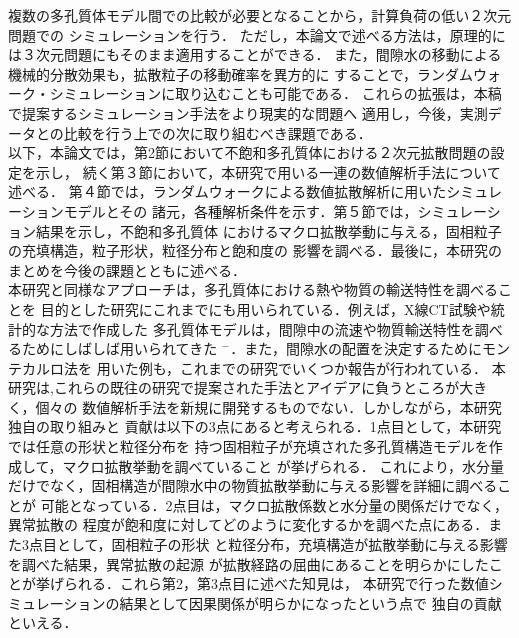 複数の多孔質体モデル間での比較が必要となることから，計算負荷の低い２次元問題での
シミュレーションを行う．
ただし，本論文で述べる方法は，原理的には３次元問題にもそのまま適用することができる．
また，間隙水の移動による機械的分散効果も，拡散粒子の移動確率を異方的に
することで，ランダムウォーク・シミュレーションに取り込むことも可能である．
これらの拡張は，本稿で提案するシミュレーション手法をより現実的な問題へ
適用し，今後，実測データとの比較を行う上での次に取り組むべき課題である．\\
\hspace{\parindent}
以下，本論文では，第2節において不飽和多孔質体における２次元拡散問題の設定を示し，
続く第３節において，本研究で用いる一連の数値解析手法について述べる．
第４節では，ランダムウォークによる数値拡散解析に用いたシミュレーションモデルとその
諸元，各種解析条件を示す．第５節では，シミュレーション結果を示し，不飽和多孔質体
におけるマクロ拡散挙動に与える，固相粒子の充填構造，粒子形状，粒径分布と飽和度の
影響を調べる．最後に，本研究のまとめを今後の課題とともに述べる．\\
\hspace{\parindent}
本研究と同様なアプローチは，多孔質体における熱や物質の輸送特性を調べることを
目的とした研究にこれまでにも用いられている．例えば，X線CT試験や統計的な方法で作成した
多孔質体モデルは，間隙中の流速や物質輸送特性を調べるためにしばしば用いられてきた
\cite{Liang}$^-$\cite{Narsilio}．また，間隙水の配置を決定するためにモンテカルロ法を
用いた例も，これまでの研究でいくつか報告が行われている\cite{Berkowitz,MC}．
本研究は,これらの既往の研究で提案された手法とアイデアに負うところが大きく，個々の
数値解析手法を新規に開発するものでない．しかしながら，本研究独自の取り組みと
貢献は以下の3点にあると考えられる．1点目として，本研究では任意の形状と粒径分布を
持つ固相粒子が充填された多孔質構造モデルを作成して，マクロ拡散挙動を調べていること
が挙げられる．
これにより，水分量だけでなく，固相構造が間隙水中の物質拡散挙動に与える影響を詳細に調べることが
可能となっている．2点目は，マクロ拡散係数と水分量の関係だけでなく，異常拡散の
程度が飽和度に対してどのように変化するかを調べた点にある．また3点目として，固相粒子の形状
と粒径分布，充填構造が拡散挙動に与える影響を調べた結果，異常拡散の起源
が拡散経路の屈曲にあることを明らかにしたことが挙げられる．これら第2，第3点目に述べた知見は，
本研究で行った数値シミュレーションの結果として因果関係が明らかになったという点で
独自の貢献といえる．
